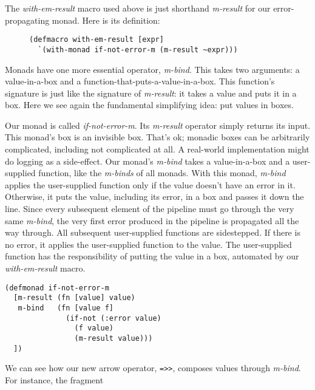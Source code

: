 \documentclass[11pt]{article}
\begin{document}
The \emph{with-em-result} macro used above is just shorthand \emph{m-result} for
our error-propagating monad. Here is its definition:
\begin{figure}[H]
\label{with-em-result-macro}
\begin{verbatim}
(defmacro with-em-result [expr]
  `(with-monad if-not-error-m (m-result ~expr)))
\end{verbatim}
\end{figure}

Monads have one more essential operator, \emph{m-bind}. This takes two
arguments: a value-in-a-box and a
function-that-puts-a-value-in-a-box. This function's signature is
just like the signature of \emph{m-result}: it takes a value and puts it
in a box. Here we see again the fundamental simplifying idea: put
values in boxes.

Our monad is called \emph{if-not-error-m}. Its \emph{m-result} operator
simply returns its input. This monad's box is an invisible box.
That's ok; monadic boxes can be arbitrarily complicated, including
not complicated at all. A real-world implementation might do
logging as a side-effect. Our monad's \emph{m-bind} takes a
value-in-a-box and a user-supplied function, like the \emph{m-binds} of
all monads. With this monad, \emph{m-bind} applies the user-supplied
function only if the value doesn't have an error in it. Otherwise,
it puts the value, including its error, in a box and passes it down
the line. Since every subsequent element of the pipeline must go
through the very same \emph{m-bind}, the very first error produced in
the pipeline is propagated all the way through. All subsequent
user-supplied functions are sidestepped. If there is no error, it
applies the user-supplied function to the value. The user-supplied
function has the responsibility of putting the value in a box,
automated by our \emph{with-em-result} macro.
\begin{verbatim}
(defmonad if-not-error-m
  [m-result (fn [value] value)
   m-bind   (fn [value f]
              (if-not (:error value)
                (f value)
                (m-result value)))
  ])
\end{verbatim}

We can see how our new arrow operator, \verb|=>>|, composes values
through \emph{m-bind}. For instance, the fragment
\end{document}
